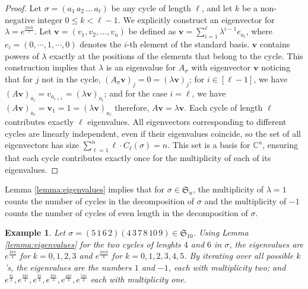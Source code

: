 \documentclass[12pt]{amsart}
\newtheorem{example}{Example}{}
\begin{document}
    \begin{proof}
        Let $\sigma = (a_1\,a_2\, \dots \, a_\ell)$ be any cycle of length $\ell$, and let $k$ be a non-negative integer $0 \le k < \ell-1$. We explicitly construct an eigenvector for $\lambda = e^{\frac{2 \pi i k}{\ell}}$. Let $\mathbf{v} = (v_1, v_2, \dots, v_n)$ be defined as $\mathbf{v} = \sum _{i = 1}^{\ell}\lambda ^ {i-1}e_{a_{i}}$, where $e_i = (0,\cdots ,1,\cdots ,0)$ denotes the $i$-th element of the standard basis. $\textbf{v}$ contains powers of $\lambda$ exactly at the positions of the elements that belong to the cycle.
        This construction implies that $\lambda$ is an eigenvalue for $A_\sigma$ with eigenvector $\mathbf{v}$ noticing that for $j$ not in the cycle, $(A_\sigma \mathbf{v})_j = 0 = (\lambda \mathbf{v})_j$; for $i \in [\ell-1]$, we have $(A\mathbf{v})_{a_{i}} = v_{a_{i+1}} = (\lambda \mathbf{v})_{a_i}$; and for the case $i = \ell$, we have $(A\mathbf{v})_{a_\ell} = \mathbf{v}_1 = 1 = (\lambda \mathbf{v})_{a_{\ell}}$ 
        therefore, $A\mathbf{v} = \lambda \mathbf{v}$.
        Each cycle of length $\ell$ contributes exactly $\ell$ eigenvalues. All eigenvectors corresponding to different cycles are linearly independent, even if their eigenvalues coincide, so the set of all eigenvectors has size $\sum _{\ell = 1}^n \ell \cdot C_{\ell}(\sigma) = n$. This set is a basis for $\mathbb{C}^n$, ensuring that each cycle contributes exactly once for the multiplicity of each of its eigenvalues.
    \end{proof}
    
    Lemma \ref{lemma:eigenvalues} implies that for $\sigma \in \mathfrak{S}_n$, the multiplicity of $\lambda = 1$ counts the number of cycles in the decomposition of $\sigma$ and the multiplicity of $-1$ counts the number of cycles of even length in the decomposition of $\sigma$.
    \begin{example}
        Let $\sigma = (5\, 1\, 6\, 2)(4\, 3\, 7\, 8\, 10\, 9)\in \mathfrak{S}_{10}$. Using Lemma \ref{lemma:eigenvalues} for the two cycles of lenghts $4$ and $6$ in $\sigma$, the eigenvalues are $e^{\frac{2\pi k}{4}}$ for $k = 0, 1, 2, 3$ and $e^{\frac{2\pi i k}{6}}$ for $k = 0, 1, 2, 3, 4, 5$. By iterating over all possible $k$'s, the eigenvalues are the numbers $1$ and $-1$, each with multiplicity two; and $e^\frac{\pi i}{2}, e^\frac{3\pi i}{2}, e^\frac{\pi i}{3}, e^\frac{2\pi i}{3}, e^\frac{4\pi i}{3}, e^\frac{5\pi i}{3}$ each with multiplicity one.
    \end{example}
\end{document}
